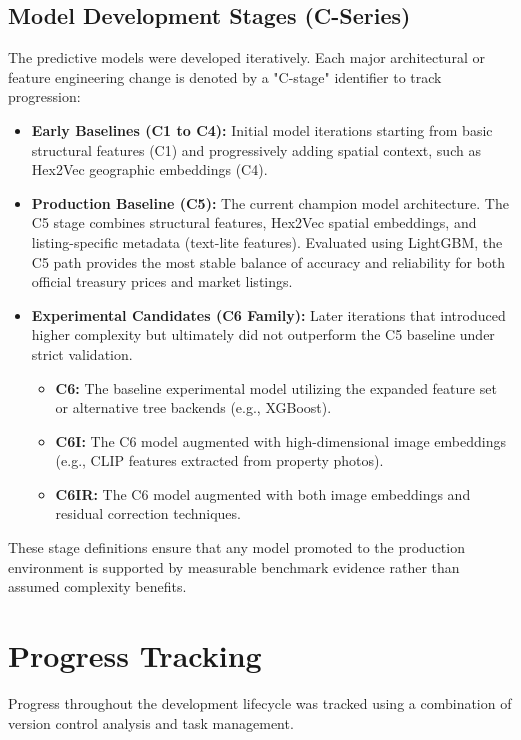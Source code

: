 \subsection{Model Development Stages (C-Series)}
The predictive models were developed iteratively. Each major architectural or feature engineering change is denoted by a "C-stage" identifier to track progression:
\begin{itemize}
    \item \textbf{Early Baselines (C1 to C4):} Initial model iterations starting from basic structural features (C1) and progressively adding spatial context, such as Hex2Vec geographic embeddings (C4).
    \item \textbf{Production Baseline (C5):} The current champion model architecture. The C5 stage combines structural features, Hex2Vec spatial embeddings, and listing-specific metadata (text-lite features). Evaluated using LightGBM, the C5 path provides the most stable balance of accuracy and reliability for both official treasury prices and market listings.
    \item \textbf{Experimental Candidates (C6 Family):} Later iterations that introduced higher complexity but ultimately did not outperform the C5 baseline under strict validation. 
    \begin{itemize}
        \item \textbf{C6:} The baseline experimental model utilizing the expanded feature set or alternative tree backends (e.g., XGBoost).
        \item \textbf{C6I:} The C6 model augmented with high-dimensional image embeddings (e.g., CLIP features extracted from property photos).
        \item \textbf{C6IR:} The C6 model augmented with both image embeddings and residual correction techniques.
    \end{itemize}
\end{itemize}
These stage definitions ensure that any model promoted to the production environment is supported by measurable benchmark evidence rather than assumed complexity benefits.

\section{Progress Tracking}

Progress throughout the development lifecycle was tracked using a combination of version control analysis and task management.

